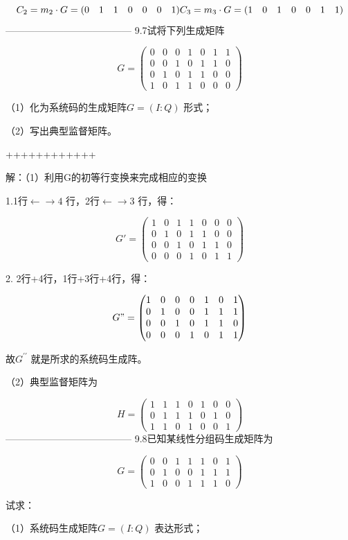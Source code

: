 \documentclass[utf8]{article}
\begin{document}
$$C_{2}=m_{2}\cdot G=(0\quad1\quad1\quad0\quad0\quad0\quad1)\\C_{3}=m_{3}\cdot G=(1\quad0\quad1\quad0\quad0\quad1\quad1)$$
---------------------------------------
9.7试将下列生成矩阵

$$G=\begin{pmatrix}0&0&0&1&0&1&1\\0&0&1&0&1&1&0\\0&1&0&1&1&0&0\\1&0&1&1&0&0&0\end{pmatrix}$$

（1）化为系统码的生成矩阵$G=(I{:}Q)$ 形式；

（2）写出典型监督矩阵。

++++++++++++

解：（1）利用G的初等行变换来完成相应的变换

1.1行$\leftarrow\rightarrow4$ 行，2行$\leftarrow\rightarrow3$ 行，得：

$$G'=\begin{pmatrix}1&0&1&1&0&0&0\\0&1&0&1&1&0&0\\0&0&1&0&1&1&0\\0&0&0&1&0&1&1\end{pmatrix}$$

2. 2行+4行，1行+3行+4行，得：

$$G"=\begin{pmatrix}1&0&0&0&1&0&1\\0&1&0&0&1&1&1\\0&0&1&0&1&1&0\\0&0&0&1&0&1&1\end{pmatrix}$$

故$G^{\prime\prime}$ 就是所求的系统码生成阵。

（2）典型监督矩阵为

$$H=\begin{pmatrix}1&1&1&0&1&0&0\\0&1&1&1&0&1&0\\1&1&0&1&0&0&1\end{pmatrix}$$
---------------------------------------
9.8已知某线性分组码生成矩阵为

$$G=\begin{pmatrix}0&0&1&1&1&0&1\\0&1&0&0&1&1&1\\1&0&0&1&1&1&0\end{pmatrix}$$

试求：

（1）系统码生成矩阵$G=(I{:}Q)$ 表达形式；
\end{document}
